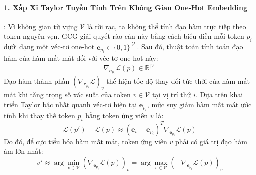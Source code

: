 \paragraph{1. Xấp Xỉ Taylor Tuyến Tính Trên Không Gian One-Hot Embedding}:
Vì không gian từ vựng $\mathcal{V}$ là rời rạc, ta không thể tính đạo hàm trực tiếp theo token nguyên vẹn. GCG giải quyết rào cản này bằng cách biểu diễn mỗi token $p_i$ dưới dạng một véc-tơ one-hot $\mathbf{e}_{p_i} \in \{0, 1\}^{|\mathcal{V}|}$.
Sau đó, thuật toán tính toán đạo hàm của hàm mất mát đối với véc-tơ one-hot này:
\begin{equation}
\nabla_{\mathbf{e}_{p_i}} \mathcal{L}(p) \in \mathbb{R}^{|\mathcal{V}|}
\end{equation}
Đạo hàm thành phần $(\nabla_{\mathbf{e}_{p_i}} \mathcal{L})_v$ thể hiện tốc độ thay đổi tức thời của hàm mất mát khi tăng trọng số xác suất của token $v \in \mathcal{V}$ tại vị trí thứ $i$.
Dựa trên khai triển Taylor bậc nhất quanh véc-tơ hiện tại $\mathbf{e}_{p_i}$, mức suy giảm hàm mất mát ước tính khi thay thế token $p_i$ bằng token ứng viên $v$ là:
\begin{equation}
\mathcal{L}(p') - \mathcal{L}(p) \approx (\mathbf{e}_v - \mathbf{e}_{p_i})^T \nabla_{\mathbf{e}_{p_i}} \mathcal{L}(p)
\end{equation}
Do đó, để cực tiểu hóa hàm mất mát, token ứng viên $v$ phải có giá trị đạo hàm âm lớn nhất:
\begin{equation}
v^{\star} \approx \arg\min_{v \in \mathcal{V}} \left( \nabla_{\mathbf{e}_{p_i}} \mathcal{L}(p) \right)_v = \arg\max_{v \in \mathcal{V}} \left( - \nabla_{\mathbf{e}_{p_i}} \mathcal{L}(p) \right)_v
\end{equation}

